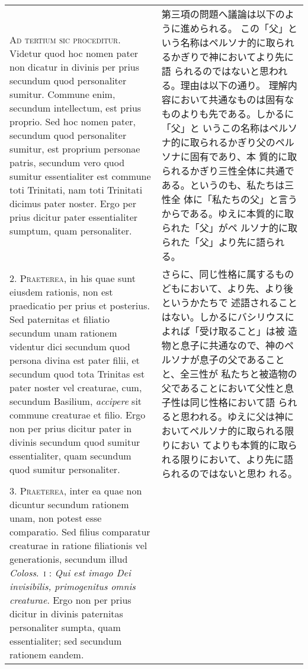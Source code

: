 \documentclass[10pt]{jsarticle} %
\begin{document}
\begin{longtable}{p{21em}p{21em}}
{\scshape Ad tertium sic proceditur}. Videtur quod hoc nomen pater non dicatur in
divinis per prius secundum quod personaliter sumitur. Commune enim,
secundum intellectum, est prius proprio. Sed hoc nomen pater, secundum
quod personaliter sumitur, est proprium personae patris, secundum vero
quod sumitur essentialiter est commune toti Trinitati, nam toti
Trinitati dicimus pater noster. Ergo per prius dicitur pater
essentialiter sumptum, quam personaliter.

&

第三項の問題へ議論は以下のように進められる。
この「父」という名称はペルソナ的に取られるかぎりで神においてより先に語
 られるのではないと思われる。理由は以下の通り。
理解内容において共通なものは固有なものよりも先である。しかるに「父」と
 いうこの名称はペルソナ的に取られるかぎり父のペルソナに固有であり、本
 質的に取られるかぎり三性全体に共通である。というのも、私たちは三性全
 体に「私たちの父」と言うからである。ゆえに本質的に取られた「父」がペ
 ルソナ的に取られた「父」より先に語られる。


\\



2. {\scshape Praeterea}, in his quae sunt eiusdem rationis, non est praedicatio per
prius et posterius. Sed paternitas et filiatio secundum unam rationem
videntur dici secundum quod persona divina est pater filii, et
secundum quod tota Trinitas est pater noster vel creaturae, cum,
secundum Basilium, {\itshape accipere} sit commune creaturae et filio. Ergo non
per prius dicitur pater in divinis secundum quod sumitur
essentialiter, quam secundum quod sumitur personaliter.

&

さらに、同じ性格に属するものどもにおいて、より先、より後というかたちで
 述語されることはない。しかるにバシリウスによれば「受け取ること」は被
 造物と息子に共通なので、神のペルソナが息子の父であることと、全三性が
 私たちと被造物の父であることにおいて父性と息子性は同じ性格において語
 られると思われる。ゆえに父は神においてペルソナ的に取られる限りにおい
 てよりも本質的に取られる限りにおいて、より先に語られるのではないと思わ
 れる。


\\



3. {\scshape Praeterea}, inter ea quae non dicuntur secundum rationem unam, non
potest esse comparatio. Sed filius comparatur creaturae in ratione
filiationis vel generationis, secundum illud {\itshape
 Coloss}.~{\scshape i} : {\itshape Qui est imago
Dei invisibilis, primogenitus omnis creaturae}. Ergo non per prius
dicitur in divinis paternitas personaliter sumpta, quam essentialiter;
sed secundum rationem eandem.


\end{longtable}
\end{document}
